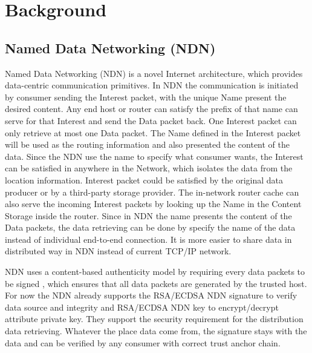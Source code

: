 \section{Background}

\subsection{Named Data Networking (NDN)}
Named Data Networking (NDN) \cite{zhang2014named} is a novel Internet architecture, which provides data-centric communication primitives. In NDN the communication is initiated by consumer sending the Interest packet, with the unique Name present the desired content. Any end host or router can satisfy the prefix of that name can serve for that Interest and send the Data packet back. One Interest packet can only retrieve at most one Data packet. The Name defined in the Interest packet will be used as the routing information and also presented the content of the data. Since the NDN use the name to specify what consumer wants, the Interest can be satisfied in anywhere in the Network, which isolates the data from the location information. Interest packet could be satisfied by the original data producer or by a third-party storage provider. The in-network router cache can also serve the incoming Interest packets by looking up the Name in the Content Storage inside the router. Since in NDN the name presents the content of the Data packets, the data retrieving can be done by specify the name of the data instead of individual end-to-end connection. It is more easier to share data in distributed way in NDN instead of current TCP/IP network.

NDN uses a content-based authenticity model by requiring every data packets to be signed \cite{yu2015name}, which ensures that all data packets are generated by the trusted host. For now the NDN already supports the RSA/ECDSA NDN signature to verify data source and integrity and RSA/ECDSA NDN key to encrypt/decrypt attribute private key. They support the security requirement for the distribution data retrieving. Whatever the place data come from, the signature stays with the data and can be verified by any consumer with correct trust anchor chain.

